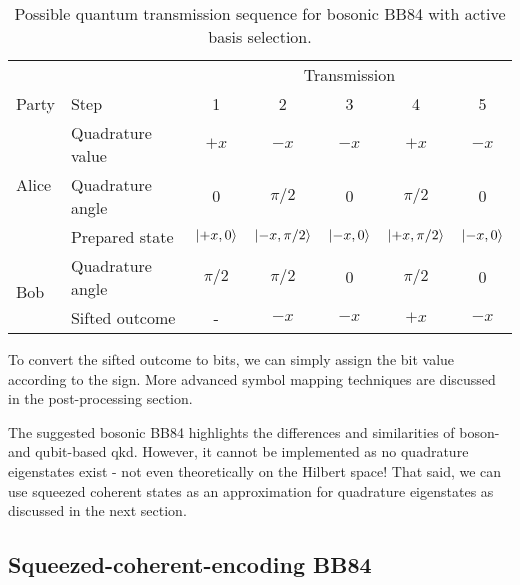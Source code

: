 \begin{table}[htb]
	\centering
	\begin{tabular}{llccccc}
		\toprule
		& & \multicolumn{5}{c}{Transmission} \\
		\cmidrule{3-7}
		Party & Step & 1 & 2 & 3 & 4 & 5 \\ 
		\midrule
		\multirow{3}{*}{Alice} & Quadrature value & $+x$ & $-x$ & $-x$ & $+x$ & $-x$ \\
		& Quadrature angle & $0$ & $\pi/2$ & $0$ & $\pi/2$ & $0$ \\
		& Prepared state & $\lvert+x,0\rangle$ & $\lvert-x,\pi/2\rangle$ & $\lvert-x,0\rangle$ & $\lvert+x,\pi/2\rangle$ & $\lvert-x,0\rangle$ \\
		\cmidrule{1-2}
		\multirow{2}{*}{Bob} & Quadrature angle & $\pi/2$ & $\pi/2$ & $0$ & $\pi/2$ & $0$ \\
		& Sifted outcome & - & $-x$ & $-x$ & $+x$ & $-x$ \\
		\bottomrule
	\end{tabular}
	\caption{Possible quantum transmission sequence for bosonic BB84 with active basis selection.}\label{tab:boson_transmission_sequence}
\end{table}
To convert the sifted outcome to bits, we can simply assign the bit value according to the sign.
More advanced symbol mapping techniques are discussed in the post-processing section.

The suggested bosonic BB84 highlights the differences and similarities of boson- and qubit-based \gls{qkd}.
However, it cannot be implemented as no quadrature eigenstates exist - not even theoretically on the Hilbert space!
That said, we can use squeezed coherent states as an approximation for quadrature eigenstates as discussed in the next section.

\FloatBarrier
\subsection{Squeezed-coherent-encoding BB84}

